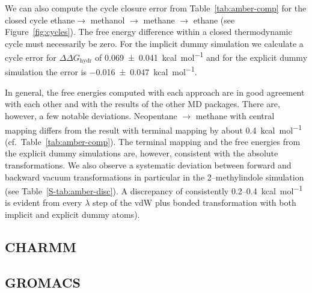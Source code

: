 \documentclass[journal=jctcce,manuscript=article]{achemso}
\begin{document}
We can also compute the cycle closure error from Table~\ref{tab:amber-comp} for the closed cycle ethane$ \rightarrow$ methanol $\rightarrow$ methane $\rightarrow$ ethane (see Figure~\ref{fig:cycles}).  The free energy difference within a closed thermodynamic cycle must necessarily be zero.
For the implicit dummy simulation we calculate a cycle error for $\Delta\Delta G_\mathrm{hydr}$ of \SI{0.069+-0.041}{kcal.mol^{-1}} and for the explicit dummy simulation the error is \SI{-0.016+-0.047}{kcal.mol^{-1}}.

In general, the free energies computed with each approach are in good agreement 
with each other and with the results of the other MD packages.  There are, 
however, a few notable deviations.  Neopentane $\rightarrow$ methane with 
central mapping differs from the result with terminal mapping by about 
\SI{0.4}{kcal.mol^{-1}} (cf.\ Table~\ref{tab:amber-comp}).
The terminal mapping and the free energies from the explicit dummy simulations 
are, however, consistent with the absolute transformations.  We also observe a 
systematic deviation between forward and backward vacuum transformations in 
particular in the 2--methylindole simulation (see Table~\ref{S-tab:amber-disc}).
A discrepancy of consistently 0.2--\SI{0.4}{kcal.mol^{-1}} is evident from every $\lambda$ step of the vdW plus bonded transformation with both implicit and explicit dummy atoms).

\subsection{CHARMM}
\label{sec:charmm-results}



\subsection{GROMACS}
\label{sec:gromacs-results}

\end{document}
